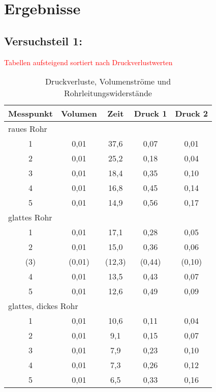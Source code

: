 \chapter{Ergebnisse}
\label{sec:ergebnisse}

\section{Versuchsteil 1: }
\textcolor{red}{Tabellen aufsteigend sortiert nach Druckverlustwerten}

\renewcommand{\arraystretch}{1.2}
\begin{table}[h!]
	\centering
	\caption{Druckverluste, Volumenströme und Rohrleitungswiderstände}
	\label{tab:messwerte}
		\begin{tabular}{c|c|c|c|c}
			\textbf{Messpunkt}	& \textbf{Volumen}& \textbf{Zeit} &\textbf{Druck 1}	& \textbf{Druck 2} \\
			\hline
			\multicolumn{5}{l}{raues Rohr} \\
			\hline
			1&0,01&37,6&0,07&0,01\\
			2&0,01&25,2&0,18&0,04\\
			3&0,01&18,4&0,35&0,10\\
			4&0,01&16,8&0,45&0,14\\
			5&0,01&14,9&0,56&0,17\\
			\hline
			\multicolumn{5}{l}{glattes Rohr} \\
			\hline
			1&0,01&17,1&0,28&0,05\\
			2&0,01&15,0&0,36&0,06\\
			(3)&(0,01)&(12,3)&(0,44)&(0,10)\\
			4&0,01&13,5&0,43&0,07\\
			5&0,01&12,6&0,49&0,09\\
			\hline
			\multicolumn{5}{l}{glattes, dickes Rohr} \\
			\hline
			1&0,01&10,6&0,11&0,04\\
			2&0,01&9,1&0,15&0,07\\
			3&0,01&7,9&0,23&0,10\\
			4&0,01&7,3&0,26&0,12\\
			5&0,01&6,5&0,33&0,16\\
		\end{tabular}
\end{table}
\FloatBarrier
\vspace*{-2.5mm}

